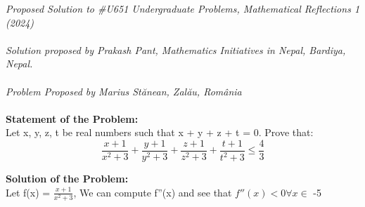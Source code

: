 \documentclass[12pt]{article}
\begin{document}
\textit{Proposed Solution to \#U651 Undergraduate Problems, Mathematical Reflections 1 (2024) }\\ \\
\textit{Solution proposed by Prakash Pant, Mathematics Initiatives in Nepal, Bardiya, Nepal.}\\ \\
\textit{Problem Proposed by Marius Stănean, Zalău, România} \\ \\
\textbf{Statement of the Problem:} \\
Let x, y, z, t be real numbers such that x + y + z + t = 0. Prove that:
\[ \frac{x+1}{x^2+3}+\frac{y+1}{y^2+3}+\frac{z+1}{z^2+3}+\frac{t+1}{t^2+3} \le \frac{4}{3} \]
 
\textbf{Solution of the Problem:} \\
Let f(x) = $\frac{x+1}{x^2+3}$,
We can compute f''(x) and see that $f''(x)<0 \forall x \in $ -5  
\end{document}
